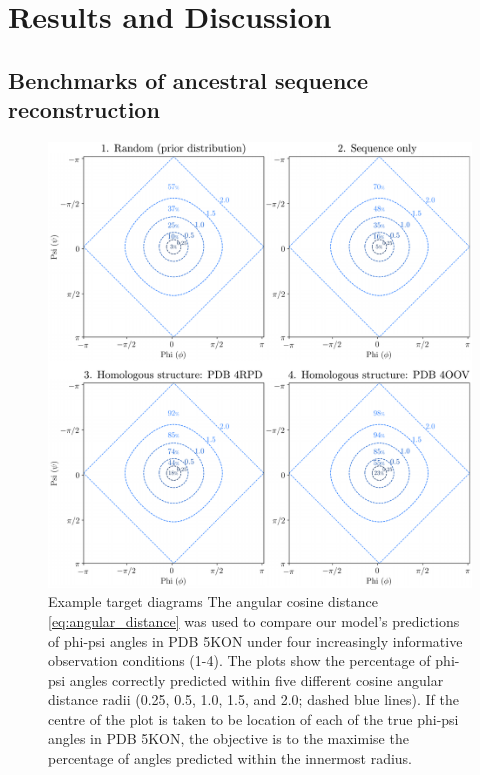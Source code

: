 \documentclass[nogrid]{MBE}%
\newcommand{\revcom}[1]{{\color{orange} #1}}
\begin{document}
\section{Results and Discussion}

\subsection{Benchmarks of ancestral sequence reconstruction}
\begin{figure}
	\centering
	\includegraphics[width=2.0\columnwidth]{figures/benchmarks-target-plot.pdf}
	\caption{\revcom{Example target diagrams} The angular cosine distance \eqref{eq:angular_distance} was used to compare our model's predictions of phi-psi angles in PDB 5KON under four increasingly informative observation conditions (1-4). The plots show the percentage of phi-psi angles correctly predicted within five different cosine angular distance radii (0.25, 0.5, 1.0, 1.5, and 2.0; dashed blue lines). If the centre of the plot is taken to be location of each of the true phi-psi angles in PDB 5KON, the objective is to the maximise the percentage of angles predicted within the innermost radius.}%
	\label{fig:benchmarkstarget}%
\end{figure}
\end{document}
